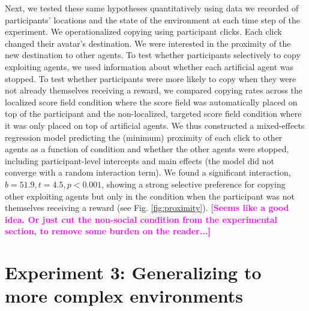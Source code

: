 \documentclass[12pt,letterpaper]{article}
\newcommand{\andrew}[1]{\textcolor{magenta}{\bf [#1]}}
\begin{document}
Next, we tested these same hypotheses quantitatively using data we recorded of participants' locations and the state of the environment at each time step of the experiment.
We operationalized copying using participant clicks.
Each click changed their avatar's destination. 
We were interested in the proximity of the new destination to other agents.
To test whether participants selectively to copy exploiting agents, we used information about whether each artificial agent was stopped.
To test whether participants were more likely to copy when they were not already themselves receiving a reward, we compared copying rates across the localized score field condition where the score field was automatically placed on top of the participant and the non-localized, targeted score field condition where it was only placed on top of artificial agents.
We thus constructed a mixed-effects regression model predicting the (minimum) proximity of each click to other agents as a function of condition and whether the other agents were stopped, including participant-level intercepts and main effects (the model did not converge with a random interaction term). 
We found a significant interaction, $b = 51.9, t = 4.5, p < 0.001$, showing a strong selective preference for copying other exploiting agents but only in the condition when the participant was not themselves receiving a reward (see Fig. \ref{fig:proximity}). 
\andrew{Seems like a good idea. Or just cut the non-social condition from the experimental section, to remove some burden on the reader...}

\section{Experiment 3: Generalizing to more complex environments}
\end{document}
